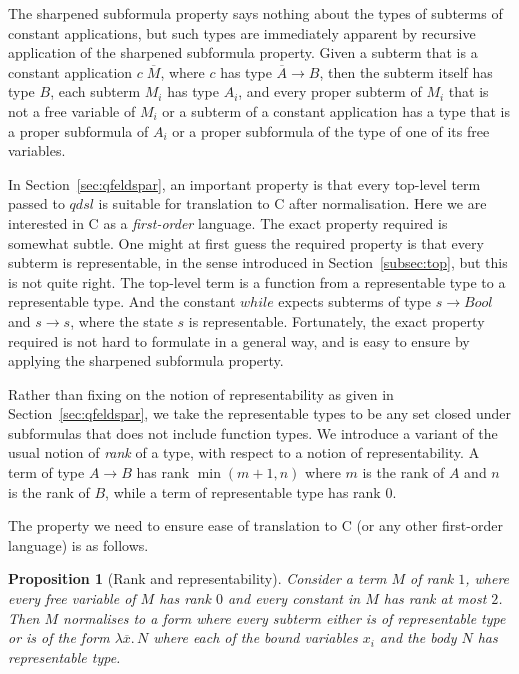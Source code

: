 \documentclass[authoryear,9pt]{sigplanconf}
\newcommand{\Conid}[1]{\mathit{#1}}
\newcommand{\Varid}[1]{\mathit{#1}}
\newtheorem{proposition}[theorem]{Proposition}
\newcommand{\app}{\;}
\newcommand{\expabs}[3]{\lambda#1.\,#3}
\begin{document}
The sharpened subformula property says nothing about the types of
subterms of constant applications, but such types are immediately apparent by
recursive application of the sharpened subformula property.  Given a
subterm that is a constant application $c \app \overline{M}$, where
$c$ has type $\overline{A} \to B$, then the subterm itself has type
$B$, each subterm $M_i$ has type $A_i$, and every proper subterm of
$M_i$ that is not a free variable of $M_i$ or a subterm of a constant
application has a type that is a proper subformula of $A_i$ or a
proper subformula of the type of one of its free variables.

In Section~\ref{sec:qfeldspar}, an important property is that every
top-level term passed to \ensuremath{\Varid{qdsl}} is suitable for translation to C after
normalisation.  Here we are interested in C as a \emph{first-order}
language. The exact property required is somewhat subtle. One might at
first guess the required property is that every subterm is
representable, in the sense introduced in
Section~\ref{subsec:top}, but this is not quite right. The
top-level term is a function from a representable type to a
representable type. And the constant \ensuremath{\Varid{while}} expects subterms of type
\ensuremath{\Varid{s}\to \Conid{Bool}} and \ensuremath{\Varid{s}\to \Varid{s}}, where the state \ensuremath{\Varid{s}} is representable.
Fortunately, the exact property required is not hard to formulate in a
general way, and is easy to ensure by applying the sharpened
subformula property.

Rather than fixing on the notion of representability
as given in Section~\ref{sec:qfeldspar}, we take the
representable types to be any set closed under subformulas
that does not include function types.
We introduce a variant of the usual notion of \emph{rank} of a type,
with respect to a notion of representability.  A term of type \ensuremath{\Conid{A}\to \Conid{B}}
has rank $\min(m+1,n)$ where $m$ is the rank of \ensuremath{\Conid{A}} and $n$ is the
rank of \ensuremath{\Conid{B}}, while a term of representable type has rank $0$.

The property we need to ensure ease of translation to C
(or any other first-order language) is as follows.

\begin{proposition}[Rank and representability]
\label{prop:rank}
Consider a term $M$ of rank $1$, where every free variable of $M$ has
rank $0$ and every constant in $M$ has rank at most $2$.  Then $M$
normalises to a form where every subterm either is of representable
type or is of the form $\expabs{\overline{x}}{}{N}$ where each of the
bound variables $x_i$ and the body $N$ has representable type.
\end{proposition}
\end{document}
